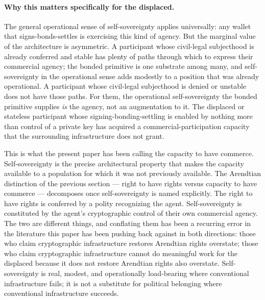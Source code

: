 \documentclass[11pt,a4paper]{article}
\theoremstyle{remark}
\begin{document}
\paragraph{Why this matters specifically for the displaced.}
The general operational sense of self-sovereignty applies
universally: any wallet that signs-bonds-settles is exercising
this kind of agency. But the marginal value of the architecture
is asymmetric. A participant whose civil-legal subjecthood is
already conferred and stable has plenty of paths through which
to express their commercial agency; the bonded primitive is one
substrate among many, and self-sovereignty in the operational
sense adds modestly to a position that was already operational.
A participant whose civil-legal subjecthood is denied or
unstable does not have those paths. For them, the operational
self-sovereignty the bonded primitive supplies \emph{is} the
agency, not an augmentation to it. The displaced or stateless
participant whose signing-bonding-settling is enabled by
nothing more than control of a private key has acquired a
commercial-participation capacity that the surrounding
infrastructure does not grant.

This is what the present paper has been calling the capacity to
have commerce. Self-sovereignty is the precise architectural
property that makes the capacity available to a population for
which it was not previously available. The Arendtian distinction
of the previous section --- right to have rights versus capacity
to have commerce --- decomposes once self-sovereignty is named
explicitly. The right to have rights is conferred by a polity
recognizing the agent. Self-sovereignty is constituted by the
agent's cryptographic control of their own commercial agency.
The two are different things, and conflating them has been a
recurring error in the literature this paper has been pushing
back against in both directions: those who claim cryptographic
infrastructure restores Arendtian rights overstate; those who
claim cryptographic infrastructure cannot do meaningful work for
the displaced because it does not restore Arendtian rights also
overstate. Self-sovereignty is real, modest, and operationally
load-bearing where conventional infrastructure fails; it is not
a substitute for political belonging where conventional
infrastructure succeeds.
\end{document}
